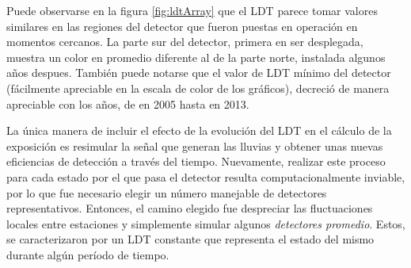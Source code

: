 	Puede observarse en la figura \ref{fig:ldtArray} que el LDT parece tomar valores similares en las regiones del detector que fueron puestas en operación en momentos cercanos.
	La parte sur del detector, primera en ser desplegada, muestra un color en promedio diferente al de la parte norte, instalada algunos años despues.
	También puede notarse que el valor de LDT mínimo del detector (fácilmente apreciable en la escala de color de los gráficos), decreció de manera apreciable con los años, de  en 2005 hasta  en 2013.
	
	La \'unica manera de incluir el efecto de la evolución del LDT en el c\'alculo de la exposici\'on es resimular la señal que generan las lluvias y obtener unas nuevas eficiencias de detecci\'on a trav\'es del tiempo.
	Nuevamente, realizar este proceso para cada estado por el que pasa el detector resulta computacionalmente inviable, por lo que fue necesario elegir un número manejable de detectores representativos.
	Entonces, el camino elegido fue despreciar las fluctuaciones locales entre estaciones y simplemente simular algunos \emph{detectores promedio}. Estos, se caracterizaron por un LDT constante que representa el estado del mismo durante algún período de tiempo.
	
